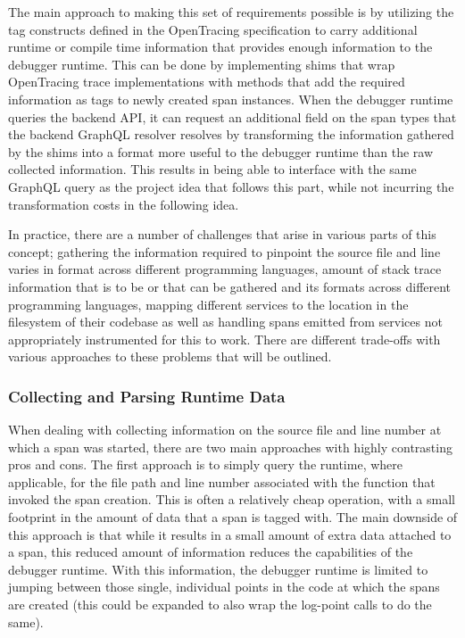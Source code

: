 \documentclass[12pt,pdftex,titlepage]{report}
\begin{document}
                    The main approach to making this set of requirements possible is by utilizing the tag constructs defined in the OpenTracing specification to carry additional runtime or
                    compile time information that provides enough information to the debugger runtime. This can be done by implementing shims that wrap OpenTracing trace implementations with
                    methods that add the required information as tags to newly created span instances. When the debugger runtime queries the backend API, it can request an additional field on
                    the span types that the backend GraphQL resolver resolves by transforming the information gathered by the shims into a format more useful to the debugger runtime than the
                    raw collected information. This results in being able to interface with the same GraphQL query as the project idea that follows this part, while not incurring the 
                    transformation costs in the following idea.

                    In practice, there are a number of challenges that arise in various parts of this concept; gathering the information required to pinpoint the source file and line varies 
                    in format across different programming languages, amount of stack trace information that is to be or that can be gathered and its formats across different programming 
                    languages, mapping different services to the location in the filesystem of their codebase as well as handling spans emitted from services not appropriately instrumented 
                    for this to work. There are different trade-offs with various approaches to these problems that will be outlined.

                \newpage
                \subsubsection{Collecting and Parsing Runtime Data}
                    When dealing with collecting information on the source file and line number at which a span was started, there are two main approaches with highly contrasting pros and cons.
                    The first approach is to simply query the runtime, where applicable, for the file path and line number associated with the function that invoked the span creation. This is often
                    a relatively cheap operation, with a small footprint in the amount of data that a span is tagged with. The main downside of this approach is that while it results in a small 
                    amount of extra data attached to a span, this reduced amount of information reduces the capabilities of the debugger runtime. With this information, the debugger runtime is
                    limited to jumping between those single, individual points in the code at which the spans are created (this could be expanded to also wrap the log-point calls to do the same).
                    
\end{document}

